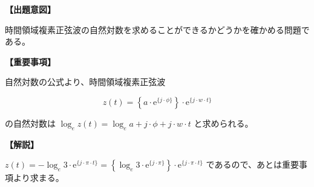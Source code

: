 \noindent \textbf{【出題意図】}

\bigskip
\noindent 時間領域複素正弦波の自然対数を求めることができるかどうかを確かめる問題である。

\vspace{1em}
\noindent \textbf{【重要事項】}

\medskip
\noindent 自然対数の公式より、時間領域複素正弦波 

\[
z(t) = \left \{ a \cdot \textrm{e}^{\{j \cdot \phi\}} \right \} \cdot \textrm{e}^{\{j \cdot w \cdot t \}}
\]

\bigskip
\noindent の自然対数は $\log_e z(t) =  \log_e a + j \cdot \phi + j \cdot w \cdot t$ と求められる。

\bigskip

\vspace{1em}
\noindent \textbf{【解説】}

\bigskip
\noindent $z(t) = -\log_e 3 \cdot \textrm{e}^{\{j \cdot \pi \cdot t \}} = \left \{ \log_e 3 \cdot \textrm{e}^{\{j \cdot \pi \}} \right \} \cdot \textrm{e}^{\{j \cdot \pi \cdot t \}}$ であるので、あとは重要事項より求まる。
